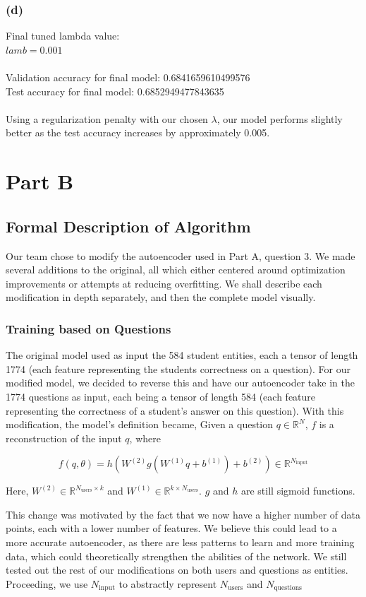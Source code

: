 \documentclass{article}
\begin{document}
\subsubsection{(d)}
Final tuned lambda value:\\
$lamb = 0.001$\\
\\
Validation accuracy for final model: 0.6841659610499576\\
Test accuracy for final model: 0.6852949477843635\\
\\
Using a regularization penalty with our chosen $\lambda$, our model performs slightly better as the test accuracy increases by approximately 0.005.
\section{Part B}
\subsection{Formal Description of Algorithm}
Our team chose to modify the autoencoder used in Part A, question 3. We made several additions to the original, all which either centered around optimization improvements or attempts at reducing overfitting. We shall describe each modification in depth separately, and then the complete model visually.
\subsubsection{Training based on Questions}
The original model used as input the 584 student entities, each a tensor of length 1774 (each feature representing the students correctness on a question). For our modified model, we decided to reverse this and have our autoencoder take in the 1774 questions as input, each being a tensor of length 584 (each feature representing the correctness of a student's answer on this question). With this modification, the model's definition became,
Given a question $q \in \mathbb{R}^{N}$, $f$ is a reconstruction of the input $q$, where 

$$f(q, \theta) = h(W^{(2)}g(W^{(1)}q + b^{(1)}) + b^{(2)}) \in \mathbb{R}^{N_{\text{input}}}$$

Here, $W^{(2)} \in \mathbb{R}^{N_{\text{users}}\times k}$ and $W^{(1)} \in \mathbb{R}^{k\times N_{\text{users}}}$. $g$ and $h$ are still sigmoid functions. 

This change was motivated by the fact that we now have a higher number of data points, each with a lower number of features. We believe this could lead to a more accurate autoencoder, as there are less patterns to learn and more training data, which could theoretically strengthen the abilities of the network. We still tested out the rest of our modifications on both users and questions as entities. Proceeding, we use $N_{\text{input}}$ to abstractly represent $N_{\text{users}}$ and $N_{\text{questions}}$
\end{document}
